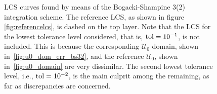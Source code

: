 \begin{figure}[htpb]
    \centering
    
    \caption[LCS curves found by means of the Bogacki-Shampine 3(2) integration
    scheme]{
        LCS curves found by means of the Bogacki-Shampine 3(2) integration
        scheme. The reference LCS, as shown in figure
        \ref{fig:referencelcs}, is dashed on the top layer. Note that
        the LCS for the lowest tolerance level considered, that is,
        $\textnormal{tol}=10^{-1}$,
        is not included. This is because the corresponding $\mathcal{U}_{0}$
        domain, shown in~\cref{fig:u0_dom_err_bs32}, and the reference
        $\mathcal{U}_{0}$, shown in~\cref{fig:u0_domain} are very
        dissimilar. The second lowest tolerance level, i.e., $\textnormal{tol}=10^{-2}$,
        is the main culprit among the remaining, as far as discrepancies are
    concerned.}
    \label{fig:lcs_rkbs32}
\end{figure}
